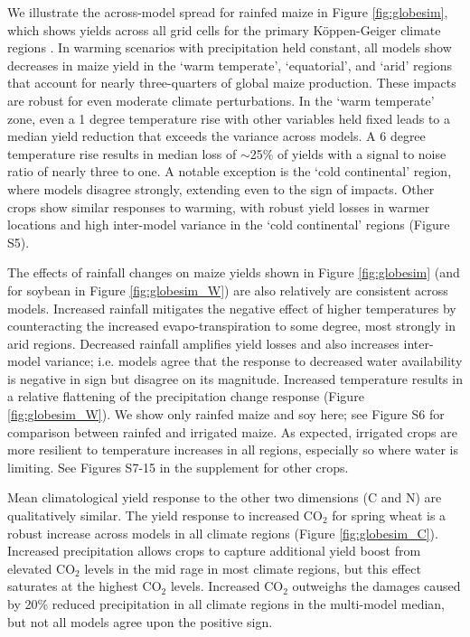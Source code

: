 \documentclass[gmd, manuscript]{copernicus} %
\begin{document}
We illustrate the across-model spread for rainfed maize in Figure \ref{fig:globesim}, which shows yields across all grid cells for the primary K\"{o}ppen-Geiger climate regions \citep{rubel2010}. 
In warming scenarios with precipitation held constant, all models show decreases in maize yield in the `warm temperate', `equatorial', and `arid' regions that account for nearly three-quarters of global maize production. 
These impacts are robust for even moderate climate perturbations. 
In the `warm temperate' zone, even a 1 degree temperature rise with other variables held fixed leads to a median yield reduction that exceeds the variance across models. 
A 6 degree temperature rise results in median loss of $\sim$25\% of yields with a signal to noise ratio of nearly three to one. A notable exception is the `cold continental' region, where models disagree strongly, extending even to the sign of impacts. 
Other crops show similar responses to warming, with robust yield losses in warmer locations and high inter-model variance in the `cold continental' regions (Figure S5).

The effects of rainfall changes on maize yields shown in Figure \ref{fig:globesim} (and for soybean in Figure \ref{fig:globesim_W}) are also relatively are consistent across models. 
Increased rainfall mitigates the negative effect of higher temperatures by counteracting the increased evapo-transpiration to some degree, most strongly in arid regions.
Decreased rainfall amplifies yield losses and also increases inter-model variance; i.e. models agree that the response to decreased water availability is negative in sign but disagree on its magnitude.
Increased temperature results in a relative flattening of the precipitation change response (Figure \ref{fig:globesim_W}).
We show only rainfed maize and soy here; see Figure S6 for comparison between rainfed and irrigated maize. As expected, irrigated crops are more resilient to temperature increases in all regions, especially so where water is limiting. 
See Figures S7-15 in the supplement for other crops.   

Mean climatological yield response to the other two dimensions (C and N) are qualitatively similar. 
The yield response to increased CO$_2$ for spring wheat is a robust increase across models in all climate regions (Figure \ref{fig:globesim_C}). 
Increased precipitation allows crops to capture additional yield boost from elevated CO$_2$ levels in the mid rage in most climate regions, but this effect saturates at the highest CO$_2$ levels. 
Increased CO$_2$ outweighs the damages caused by 20\% reduced precipitation in all climate regions in the multi-model median, but not all models agree upon the positive sign.
\end{document}
